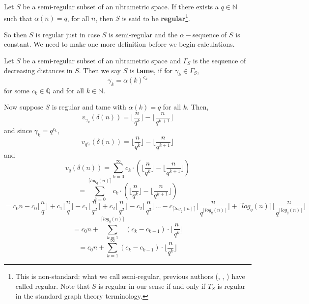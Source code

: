 \begin{definition}
Let $S$ be a semi-regular subset of an ultrametric space. If there exists a $q \in \mathbb{N}$ such that $\alpha(n) = q$, for all $n$, then $S$ is said to be \textbf{regular}\footnote{This is non-standard: what we call semi-regular, previous authors (\cite{cef}, \cite{fp}, \cite{amice}) have called regular. Note that $S$ is regular in our sense if and only if $T_S$ is regular in the standard graph theory terminology.}. %
\end{definition}


So then $S$ is regular just in case $S$ is semi-regular and the $\alpha-$sequence of $S$ is constant. We need to make one more definition before we begin calculations. \\

\begin{definition}
Let $S$ be a semi-regular subset of an ultrametric space and $\Gamma_S$ is the sequence of decreasing distances in $S$. Then we say $S$ is \textbf{tame}, if for $\gamma_k \in \Gamma_S$, \[\gamma_k = \alpha(k)^{c_k}\] for some $c_k \in \mathbb{Q}$ and for all $k \in \mathbb{N}$.
\end{definition}

Now suppose $S$ is regular and tame with $\alpha(k)=q$ for all $k$. Then,
\[v_{\gamma_k}(\delta(n)) =  \lfloor\frac{n}{q^k}\rfloor - \lfloor\frac{n}{q^{k+1}}\rfloor \]
and since $\gamma_k = q^{c_k}$,
\[v_{q^{c_k}}(\delta(n)) =  \lfloor\frac{n}{q^k}\rfloor - \lfloor\frac{n}{q^{k+1}}\rfloor \]
and
\[v_{q}(\delta(n)) =  \sum_{k=0}^{\infty} c_k \cdot(\lfloor\frac{n}{q^k}\rfloor - \lfloor\frac{n}{q^{k+1}}\rfloor) \]
\[=  \sum_{k=0}^{\lceil log_q(n) \rceil} c_k \cdot(\lfloor\frac{n}{q^k}\rfloor - \lfloor\frac{n}{q^{k+1}}\rfloor) \]
\[=  c_0n - c_0\lfloor\frac{n}{q}\rfloor + c_1\lfloor\frac{n}{q}\rfloor - c_1\lfloor\frac{n}{q^{2}}\rfloor  + c_2\lfloor\frac{n}{q^2}\rfloor - c_2\lfloor\frac{n}{q^{3}}\rfloor \ldots - c_{\lceil log_q(n) \rceil} \lfloor\frac{n}{q^{\lceil log_q(n) \rceil}}\rfloor + \lceil log_q(n) \rceil\lfloor\frac{n}{q^{\lceil log_q(n) \rceil}}\rfloor  \]
\[= c_0n + \sum_{k=1}^{\lceil log_q(n) \rceil} (c_{k} - c_{k-1}) \cdot \lfloor\frac{n}{q^{k}}\rfloor \]
\[=  c_0n + \sum_{k=1}^{\infty} (c_{k} - c_{k-1}) \cdot \lfloor\frac{n}{q^{k}}\rfloor \]

